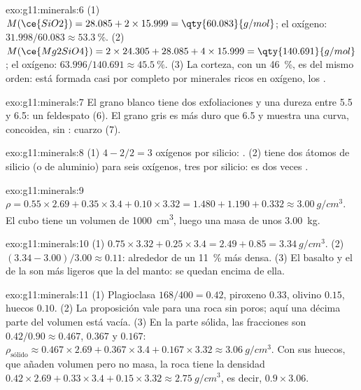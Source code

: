 \begin{solution}{exo:g11:minerals:6}
(1) $M(\ce{SiO2}) = 28.085 + 2 \times 15.999 = \qty{60.083}{g/mol}$;
el oxígeno: $31.998/60.083 \approx \qty{53.3}{\percent}$.
(2) $M(\ce{Mg2SiO4}) = 2 \times 24.305 + 28.085 + 4 \times 15.999 =
\qty{140.691}{g/mol}$; el oxígeno: $63.996/140.691 \approx \qty{45.5}{\percent}$.
(3) La corteza, con un \qty{46}{\percent}, es del mismo orden: está formada
casi por completo por minerales ricos en oxígeno, los .
\end{solution}

\begin{solution}{exo:g11:minerals:7}
El grano blanco tiene dos exfoliaciones y una dureza entre 5.5 y 6.5: un
feldespato (6). El grano gris es más duro que 6.5 y muestra una 
curva, concoidea, sin : cuarzo (7).
\end{solution}

\begin{solution}{exo:g11:minerals:8}
(1) $4 - 2/2 = 3$ oxígenos por silicio: . (2)  tiene
dos átomos de silicio (o de aluminio) para seis oxígenos, tres por silicio: es
dos veces .
\end{solution}

\begin{solution}{exo:g11:minerals:9}
$\rho = 0.55 \times 2.69 + 0.35 \times 3.4 + 0.10 \times 3.32 = 1.480 + 1.190
+ 0.332 \approx \qty{3.00}{g/cm^3}$. El cubo tiene un volumen de
\qty{1000}{cm^3}, luego una masa de unos \qty{3.00}{kg}.
\end{solution}

\begin{solution}{exo:g11:minerals:10}
(1) $0.75 \times 3.32 + 0.25 \times 3.4 = 2.49 + 0.85 = \qty{3.34}{g/cm^3}$.
(2) $(3.34 - 3.00)/3.00 \approx 0.11$: alrededor de un \qty{11}{\percent} más
densa. (3) El basalto y el  de la  son más ligeros que la
 del manto: se quedan encima de ella.
\end{solution}

\begin{solution}{exo:g11:minerals:11}
(1) Plagioclasa $168/400 = 0.42$, piroxeno $0.33$, olivino $0.15$, huecos
$0.10$. (2) La proposición vale para una roca sin poros; aquí una décima parte
del volumen está vacía. (3) En la parte sólida, las fracciones son $0.42/0.90
\approx 0.467$, $0.367$ y $0.167$:
$\rho_{\text{sólido}} \approx 0.467 \times 2.69 + 0.367 \times 3.4 + 0.167
\times 3.32 \approx \qty{3.06}{g/cm^3}$. Con sus huecos, que añaden volumen
pero no masa, la roca tiene la densidad $0.42 \times 2.69 + 0.33 \times 3.4 +
0.15 \times 3.32 \approx \qty{2.75}{g/cm^3}$, es decir, $0.9 \times 3.06$.
\end{solution}

